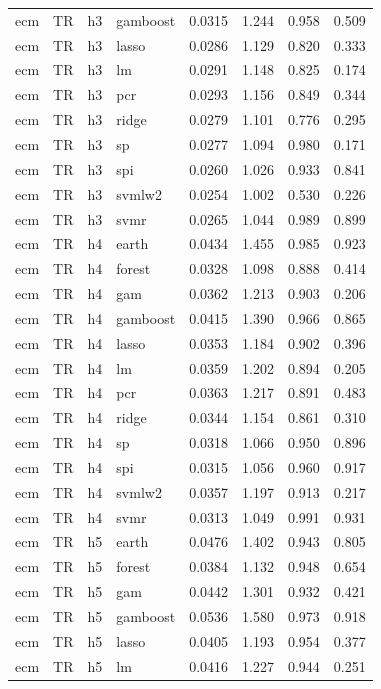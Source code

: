 \begin{ThreePartTable}
\begin{longtable}[t]{llclcccc}
ecm & TR & h3 & gamboost & 0.0315 & 1.244 & 0.958 & 0.509\\
ecm & TR & h3 & lasso & 0.0286 & 1.129 & 0.820 & 0.333\\
ecm & TR & h3 & lm & 0.0291 & 1.148 & 0.825 & 0.174\\
ecm & TR & h3 & pcr & 0.0293 & 1.156 & 0.849 & 0.344\\
ecm & TR & h3 & ridge & 0.0279 & 1.101 & 0.776 & 0.295\\
ecm & TR & h3 & sp & 0.0277 & 1.094 & 0.980 & 0.171\\
ecm & TR & h3 & spi & 0.0260 & 1.026 & 0.933 & 0.841\\
ecm & TR & h3 & svmlw2 & 0.0254 & 1.002 & 0.530 & 0.226\\
ecm & TR & h3 & svmr & 0.0265 & 1.044 & 0.989 & 0.899\\
\addlinespace
ecm & TR & h4 & earth & 0.0434 & 1.455 & 0.985 & 0.923\\
ecm & TR & h4 & forest & 0.0328 & 1.098 & 0.888 & 0.414\\
ecm & TR & h4 & gam & 0.0362 & 1.213 & 0.903 & 0.206\\
ecm & TR & h4 & gamboost & 0.0415 & 1.390 & 0.966 & 0.865\\
ecm & TR & h4 & lasso & 0.0353 & 1.184 & 0.902 & 0.396\\
ecm & TR & h4 & lm & 0.0359 & 1.202 & 0.894 & 0.205\\
ecm & TR & h4 & pcr & 0.0363 & 1.217 & 0.891 & 0.483\\
ecm & TR & h4 & ridge & 0.0344 & 1.154 & 0.861 & 0.310\\
ecm & TR & h4 & sp & 0.0318 & 1.066 & 0.950 & 0.896\\
ecm & TR & h4 & spi & 0.0315 & 1.056 & 0.960 & 0.917\\
ecm & TR & h4 & svmlw2 & 0.0357 & 1.197 & 0.913 & 0.217\\
ecm & TR & h4 & svmr & 0.0313 & 1.049 & 0.991 & 0.931\\
\addlinespace
ecm & TR & h5 & earth & 0.0476 & 1.402 & 0.943 & 0.805\\
ecm & TR & h5 & forest & 0.0384 & 1.132 & 0.948 & 0.654\\
ecm & TR & h5 & gam & 0.0442 & 1.301 & 0.932 & 0.421\\
ecm & TR & h5 & gamboost & 0.0536 & 1.580 & 0.973 & 0.918\\
ecm & TR & h5 & lasso & 0.0405 & 1.193 & 0.954 & 0.377\\
ecm & TR & h5 & lm & 0.0416 & 1.227 & 0.944 & 0.251\\

\end{longtable}
\end{ThreePartTable}

